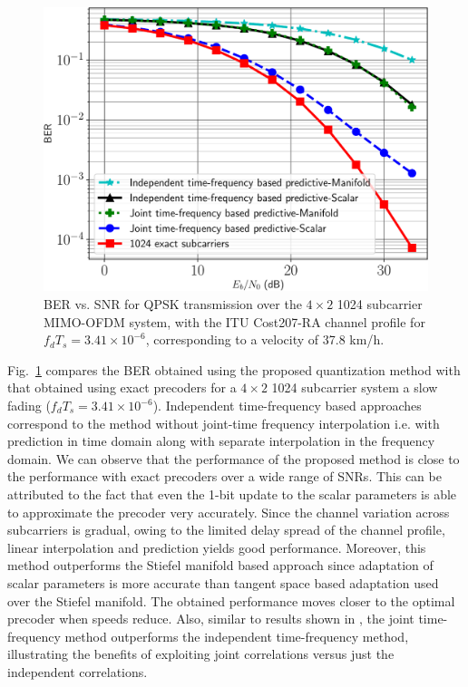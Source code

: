 \documentclass[journal,10pt,twocolumn]{IEEEtran}
\def\imwidth{0.65}
\begin{document}
\begin{figure}
\begin{center}
\includegraphics[width=\imwidth\columnwidth]{images/1024final_withtime}
\caption{BER vs. SNR for QPSK transmission over the $4\times 2$ 1024
  subcarrier MIMO-OFDM system, with the ITU Cost207-RA channel profile
  for $f_dT_s = 3.41\times 10^{-6}$, corresponding to a velocity of 37.8 km/h.}
\label{fig:ber_ped}
\end{center}
\end{figure}

Fig.~\ref{fig:ber_ped} compares the BER obtained using the proposed
quantization method with that obtained using exact precoders for a
$4\times 2$ 1024 subcarrier system a slow fading
($f_dT_s = 3.41 \times 10^{-6}$). Independent time-frequency based
approaches correspond to the method without joint-time frequency
interpolation i.e. with prediction in time domain along with separate interpolation in the frequency domain.
We can observe that the performance of the proposed
method is close to the performance with exact precoders over a wide
range of SNRs. This can be attributed to the fact that even the 1-bit
update to the scalar parameters is able to approximate the precoder
very accurately. Since the channel variation across subcarriers is
gradual, owing to the limited delay spread of the channel profile,
linear interpolation and prediction yields good performance. Moreover,
this method outperforms the Stiefel manifold based approach since
adaptation of scalar parameters is more accurate than tangent space
based adaptation used over the Stiefel manifold. The obtained
performance moves closer to the optimal precoder when speeds reduce.
Also, similar to results shown in \cite{Gupt1905:Predictive}, the
joint time-frequency method outperforms the independent time-frequency
method, illustrating the benefits of exploiting joint correlations
versus just the independent correlations.
\end{document}
